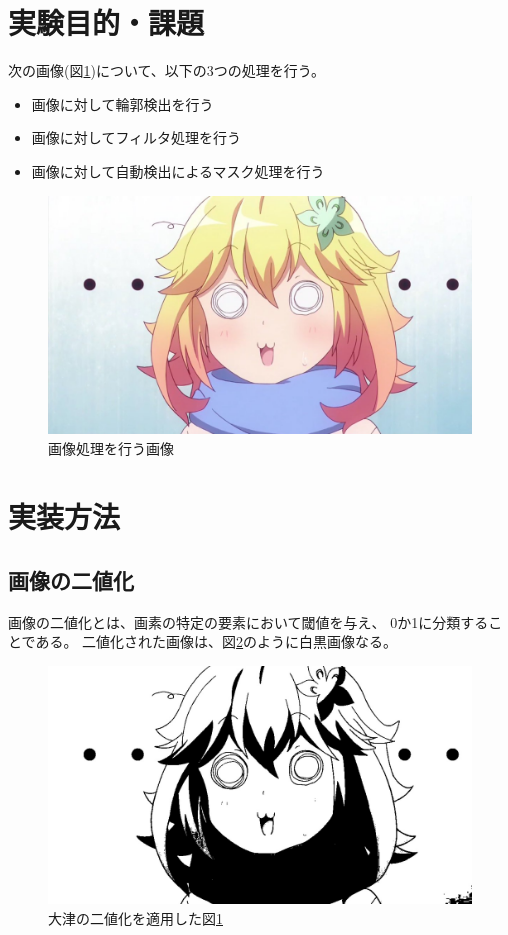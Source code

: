 \documentclass[dvipdfmx]{jsarticle}
\begin{document}
\section{実験目的・課題}

次の画像(図\ref{fig:tapu})について、以下の3つの処理を行う。

\begin{itemize}
  \item 画像に対して輪郭検出を行う
  \item 画像に対してフィルタ処理を行う
  \item 画像に対して自動検出によるマスク処理を行う
\end{itemize}

\begin{figure}[H]
  \centering
  \includegraphics[width=0.7\hsize]{../pic/tapu.png}
  \caption{画像処理を行う画像}
  \label{fig:tapu}
\end{figure}


\section{実装方法}

\subsection{画像の二値化}

画像の二値化とは、画素の特定の要素において閾値を与え、
0か1に分類することである。
二値化された画像は、図\ref{fig:binarization}のように白黒画像なる。
\begin{figure}[htbp]
  \centering
  \includegraphics[width=0.7\hsize]{../pic/binarization.jpg}
  \caption{大津の二値化を適用した図\ref{fig:tapu}}
  \label{fig:binarization}
\end{figure}
\end{document}

